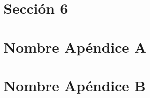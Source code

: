 \documentclass[11pt]{article}
\begin{document}
\newpage
\seteocontadores
\section{Sección 6}
\label{sec:seccion6}


\appendix %
\clearpage
\newpage
{} %
\def \nombreapendice{A} %
\formatoapendice %
\seteocontadores %
\section{Nombre Apéndice A}\label{ApendiceA} %


\clearpage
\newpage
{}
\def \nombreapendice{B}
\formatoapendice
\seteocontadores
\section{Nombre Apéndice B}\label{Apendice B}


\clearpage
\newpage
{}
\seteocontadores
\rfoot{ }
\lfoot{ }


\end{document}
